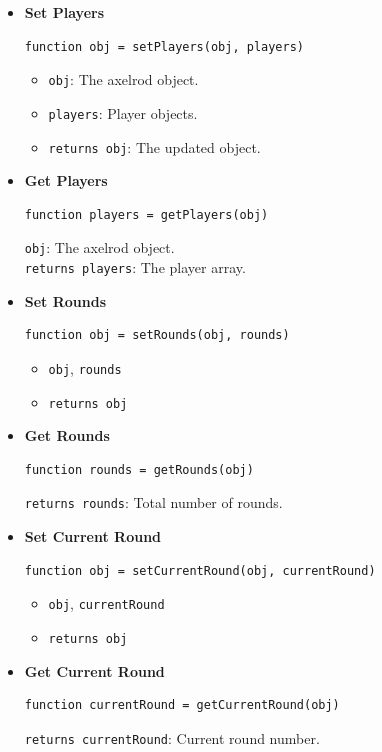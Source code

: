 \documentclass[12pt]{report}
\begin{document}
\begin{itemize}
  \item \textbf{Set Players}
  \begin{verbatim}
function obj = setPlayers(obj, players)
  \end{verbatim}
  \begin{itemize}
    \item \texttt{obj}: The axelrod object.
    \item \texttt{players}: Player objects.
    \item \texttt{returns obj}: The updated object.
  \end{itemize}

  \item \textbf{Get Players}
  \begin{verbatim}
function players = getPlayers(obj)
  \end{verbatim}
  \texttt{obj}: The axelrod object.\\
  \texttt{returns players}: The player array.

  \item \textbf{Set Rounds}
  \begin{verbatim}
function obj = setRounds(obj, rounds)
  \end{verbatim}
  \begin{itemize}
    \item \texttt{obj}, \texttt{rounds}
    \item \texttt{returns obj}
  \end{itemize}

  \item \textbf{Get Rounds}
  \begin{verbatim}
function rounds = getRounds(obj)
  \end{verbatim}
  \texttt{returns rounds}: Total number of rounds.

  \item \textbf{Set Current Round}
  \begin{verbatim}
function obj = setCurrentRound(obj, currentRound)
  \end{verbatim}
  \begin{itemize}
    \item \texttt{obj}, \texttt{currentRound}
    \item \texttt{returns obj}
  \end{itemize}

  \item \textbf{Get Current Round}
  \begin{verbatim}
function currentRound = getCurrentRound(obj)
  \end{verbatim}
  \texttt{returns currentRound}: Current round number.


\end{itemize}
\end{document}
